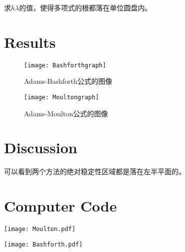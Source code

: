 \documentclass{article}
\begin{document}
	求$h\lambda$的值，使得多项式的根都落在单位圆盘内。
	
	\section{Results}
	
		\begin{figure}[H]
		\begin{center}
			
			\texttt{[image: Bashforthgraph]}
			
			\caption{Adams-Bashforth公式的图像} \label{Bashforthgraph.label}
		\end{center}
	\end{figure}
	
	\begin{figure}[H]
		\begin{center}
			
			\texttt{[image: Moultongraph]}
			
			\caption{Adams-Moulton公式的图像} \label{Moultongraph.label}
		\end{center}
	\end{figure}


	\section{Discussion}
	
    可以看到两个方法的绝对稳定性区域都是落在左半平面的。
	
	\section{Computer Code}
	\texttt{[image: Moulton.pdf]}
	
	\texttt{[image: Bashforth.pdf]}
\end{document}
